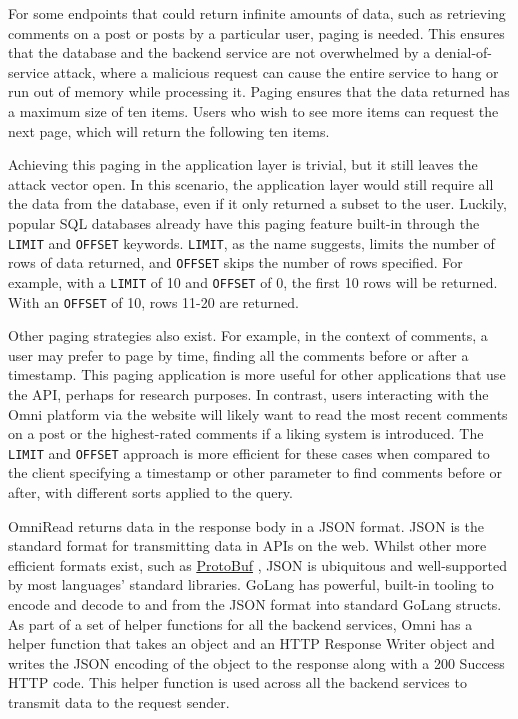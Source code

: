 For some endpoints that could return infinite amounts of data, such as retrieving comments on a post or posts by a particular user, paging is needed.
This ensures that the database and the backend service are not overwhelmed by a denial-of-service attack, where a malicious request can cause the entire service to hang or run out of memory while processing it. 
Paging ensures that the data returned has a maximum size of ten items. Users who wish to see more items can request the next page, which will return the following ten items.

Achieving this paging in the application layer is trivial, but it still leaves the attack vector open. In this scenario, the application layer would still require all the data from the database, even if it only returned a subset to the user. 
Luckily, popular SQL databases already have this paging feature built-in through the \verb|LIMIT| and \verb|OFFSET| keywords.
\verb|LIMIT|, as the name suggests, limits the number of rows of data returned, and \verb|OFFSET| skips the number of rows specified.
For example, with a \verb|LIMIT| of 10 and \verb|OFFSET| of 0, the first 10 rows will be returned. With an \verb|OFFSET| of 10, rows 11-20 are returned. 



Other paging strategies also exist. For example, in the context of comments, a user may prefer to page by time, finding all the comments before or after a timestamp.
This paging application is more useful for other applications that use the API, perhaps for research purposes.
In contrast, users interacting with the Omni platform via the website will likely want to read the most recent comments on a post or the highest-rated comments if a liking system is introduced.
The \verb|LIMIT| and \verb|OFFSET| approach is more efficient for these cases when compared to the client specifying a timestamp or other parameter to find comments before or after, with different sorts applied to the query. 

OmniRead returns data in the response body in a JSON format. JSON is the standard format for transmitting data in APIs on the web.
Whilst other more efficient formats exist, such as \underline{\href{https://protobuf.dev}{ProtoBuf}} \nocite{protobuf}, JSON is ubiquitous and well-supported by most languages' standard libraries.
GoLang has powerful, built-in tooling to encode and decode to and from the JSON format into standard GoLang structs.
As part of a set of helper functions for all the backend services, Omni has a helper function that takes an object and an HTTP Response Writer object and writes the JSON encoding of the object to the response along with a 200 Success HTTP code.
This helper function is used across all the backend services to transmit data to the request sender. 

